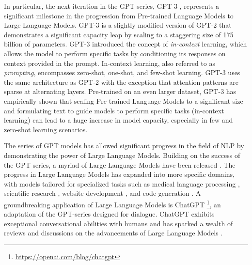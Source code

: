 In particular, the next iteration in the \ac{GPT} series, \ac{GPT}-3 \citep{brown2020language}, represents a significant milestone in the progression from Pre-trained Language Models to Large Language Models. \ac{GPT}-3 is a slightly modified version of \ac{GPT}-2 that demonstrates a significant capacity leap by scaling to a staggering size of 175 billion of parameters. \ac{GPT}-3 introduced the concept of \textit{in-context} learning, which allows the model to perform specific tasks by conditioning its responses on context provided in the prompt. In-context learning, also referred to as \textit{prompting}, encompasses zero-shot, one-shot, and few-shot learning. \ac{GPT}-3 uses the same architecture as \ac{GPT}-2 with the exception that attention patterns are sparse at alternating layers. Pre-trained on an even larger dataset, \ac{GPT}-3 has empirically shown that scaling Pre-trained Language Models to a significant size and formulating text to guide models to perform specific tasks (in-context learning) can lead to a huge increase in model capacity, especially in few and zero-shot learning scenarios.



The series of \ac{GPT} models has allowed significant progress in the field of \ac{NLP} by demonstrating the power of Large Language Models. Building on the success of the \ac{GPT} series, a myriad of Large Language Models have been released \citep{scao2022bloom, chowdhery2022palm, touvron2023llama}. The progress in Large Language Models has expanded into more specific domains, with models tailored for specialized tasks such as medical language processing \citep{thirunavukarasu2023large}, scientific research \citep{wang2023scientific}, website development \citep{wang2023software}, and code generation \citep{xu2022systematic}. A groundbreaking application of Large Language Models is ChatGPT \footnote{\url{https://openai.com/blog/chatgpt}}, an adaptation of the \ac{GPT}-series designed for dialogue. ChatGPT exhibits exceptional conversational abilities with humans and has sparked a wealth of reviews and discussions on the advancements of Large Language Models \citep{zhao2023survey, mohamadi2023chatgpt, hadi2023large}. 

